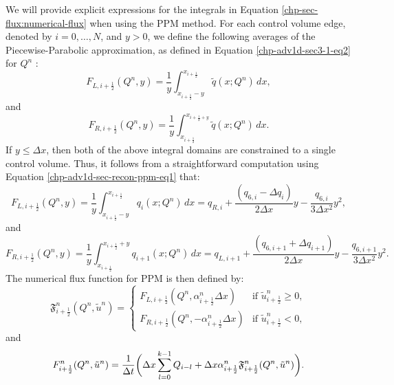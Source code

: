 We will provide explicit expressions for the integrals in Equation \eqref{chp-sec-flux:numerical-flux} 
when using the PPM method. For each control volume edge, denoted by $i=0, \ldots, N$, and $y>0$, 
we define the following averages of the Piecewise-Parabolic approximation, as defined in
Equation \eqref{chp-adv1d-sec3-1-eq2} for $Q^{n}$ \citep{colella:1984}:
\begin{equation}
	\label{chp-sec-flux:fL_1}
	F_{L,i+\frac{1}{2}}(Q^n,y) = \frac{1}{y} \int_{x_{i+\frac{1}{2}}-y}^{x_{i+\frac{1}{2}}}
	\tilde{q}(x;Q^n)\,dx,
\end{equation}
and
\begin{equation}
	\label{chp-sec-flux:fR_1}
	F_{R,i+\frac{1}{2}}(Q^n,y) = \frac{1}{y} \int_{x_{i+\frac{1}{2}}}^{x_{i+\frac{1}{2}+y}}
	\tilde{q}(x;Q^n)\,dx.
\end{equation}
If $y \leq \Delta x$, then both of the above integral domains
are constrained to a single control volume. Thus,
it follows from a straightforward computation using 
Equation \eqref{chp-adv1d-sec-recon-ppm-eq1} that:
\begin{equation}
	\label{chp-sec-flux:fL_2}
	F_{L,i+\frac{1}{2}}(Q^n,y) = \frac{1}{y} \int_{x_{i+\frac{1}{2}}-y}^{x_{i+\frac{1}{2}}}
	q_{i}(x;Q^n)\,dx = 
	q_{R,i} +\frac{(q_{6,i} - \Delta q_i)}{2\Delta x}y
	- \frac{q_{6,i}}{3\Delta x^2}y^2,
\end{equation}
and
\begin{equation}
	\label{chp-sec-flux:fR_2}
	F_{R,i+\frac{1}{2}}(Q^n,y) = \frac{1}{y} \int_{x_{i+\frac{1}{2}}}^{x_{i+\frac{1}{2}}+y}
	q_{i+1}(x;Q^n)\,dx = 
	q_{L,i+1} +\frac{(q_{6,i+1} + \Delta q_{i+1})}{2\Delta x}y
	- \frac{q_{6,i+1}}{3\Delta x^2}y^2.
\end{equation}
The numerical flux function for PPM is then defined by:
\begin{equation}
	\label{chp-sec-flux:numerical-flux2}
        \mathfrak{F}_{i+\frac{1}{2}}^n(Q^n,\tilde{u}^n) =
    	\begin{cases} F_{L,i+\frac{1}{2}}(Q^n, {\alpha}_{i+\frac{1}{2}}^n\Delta x) & \text{if } \tilde{u}_{i+\frac{1}{2}}^n \geq 0,\\
		      F_{R,i+\frac{1}{2}}(Q^n,-{\alpha}_{i+\frac{1}{2}}^n\Delta x) & \text{if } \tilde{u}_{i+\frac{1}{2}}^n<0,
    	\end{cases}
\end{equation}
and
\begin{equation}
	\label{chp-sec-flux:numerical-flux3}
         {F}_{i+\frac{1}{2}}^n(Q^n,\tilde{u}^n)  =  \frac{1}{\Delta t} \bigg(
    	\Delta x\sum_{l=0}^{k-1} Q_{i-l} +  
        \Delta x {\alpha}_{i+\frac{1}{2}}^n\mathfrak{F}_{i+\frac{1}{2}}^n(Q^n,\tilde{u}^n)\bigg).\\
\end{equation}
